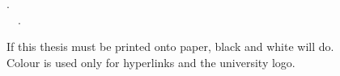 \vspace*{\fill}

\begin{information}

\thetitle. \\
\textcopyright~\theyear~\theauthor.


If this thesis must be printed onto paper, black and white will do. \\
Colour is used only for hyperlinks and the university logo.

\end{information}

\vspace{5em}
